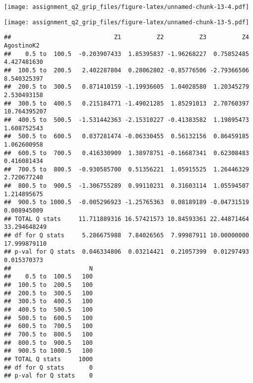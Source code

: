 \texttt{[image: assignment\_q2\_grip\_files/figure-latex/unnamed-chunk-13-4.pdf]}

\begin{Shaded}
\begin{Highlighting}[]
\OtherTok{\textless{}{-}} 
\end{Highlighting}
\end{Shaded}

\texttt{[image: assignment\_q2\_grip\_files/figure-latex/unnamed-chunk-13-5.pdf]}

\begin{Shaded}
\begin{Highlighting}[]
\end{Highlighting}
\end{Shaded}

\begin{verbatim}
##                             Z1          Z2          Z3          Z4   AgostinoK2
##    0.5 to  100.5  -0.203907433  1.85395837 -1.96268227  0.75852485  4.427481630
##  100.5 to  200.5   2.402287804  0.28062802 -0.85776506 -2.79366506  8.540325397
##  200.5 to  300.5   0.871410159 -1.19936605  1.04028580  1.20345279  2.530493158
##  300.5 to  400.5   0.215184771 -1.49021285  1.85291013  2.70760397 10.764395207
##  400.5 to  500.5  -1.531442363 -2.15310227 -0.41383582  1.19895473  1.608752543
##  500.5 to  600.5   0.037281474 -0.06330455  0.56132156  0.86459185  1.062600958
##  600.5 to  700.5   0.416330909  1.38978751 -0.16687341  0.62308483  0.416081434
##  700.5 to  800.5  -0.930585700  0.51356221  1.05915525  1.26446329  2.720677240
##  800.5 to  900.5  -1.306755289  0.99110231  0.31603114  1.05594507  1.214895675
##  900.5 to 1000.5  -0.005296923 -1.25765363  0.08189189 -0.04731519  0.008945009
## TOTAL Q stats     11.711889316 16.57421573 10.84593361 22.44871464 33.294648249
## df for Q stats     5.286675988  7.84026565  7.99987911 10.00000000 17.999879110
## p-val for Q stats  0.046334806  0.03214421  0.21057399  0.01297493  0.015370373
##                      N
##    0.5 to  100.5   100
##  100.5 to  200.5   100
##  200.5 to  300.5   100
##  300.5 to  400.5   100
##  400.5 to  500.5   100
##  500.5 to  600.5   100
##  600.5 to  700.5   100
##  700.5 to  800.5   100
##  800.5 to  900.5   100
##  900.5 to 1000.5   100
## TOTAL Q stats     1000
## df for Q stats       0
## p-val for Q stats    0
\end{verbatim}

